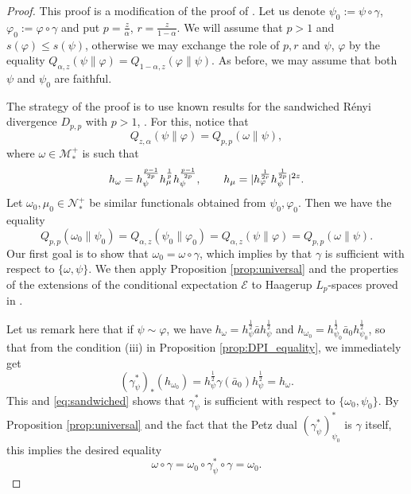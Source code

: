 \documentclass[12pt]{article}
\theoremstyle{definition}
\theoremstyle{remark}
\numberwithin{equation}{section}
\def\cE{\mathcal E}
\def\Me{\mathcal M}
\def\Ne{\mathcal N}
\def\ffi{\varphi}
\begin{document}
\begin{proof} This proof is a modification of the proof of \cite[Thm.
5.1]{jencova2021renyi}. Let us denote $\psi_0:=\psi\circ\gamma$,
$\varphi_0:=\varphi\circ\gamma$ and put $p=\frac{z}{\alpha}$, $r=\frac{z}{1-\alpha}$.  
We will assume that $p>1$ and $s(\ffi)\le s(\psi)$,
otherwise we may exchange the role of $p,r$ and $\psi$, $\ffi$ by the equality
$Q_{\alpha,z}(\psi\|\varphi)=Q_{1-\alpha,z}(\varphi\|\psi)$. As before, we may assume that
both $\psi$ and $\psi_0$ are faithful.

The strategy of the proof is to use known results for the sandwiched R\'enyi divergence
$D_{p,p}$ with $p>1$, \cite[]{jencova2018renyi}. For this, notice that
\[
Q_{z,\alpha}(\psi\|\ffi)=Q_{p,p}(\omega\|\psi),
\]
where $\omega\in \Me_*^+$ is such that
\begin{equation}\label{eq:omega}
h_\omega=h_\psi^{p-1\over 2p}h_\mu^{\frac1p}h_\psi^{p-1\over 2p},\qquad
h_{\mu}=|h_{\ffi}^{1\over 2r}h_{\psi}^{1\over 2p}|^{2z}.
\end{equation}
Let $\omega_0,\mu_0\in \Ne_*^+$ be similar functionals obtained from $\psi_0,\ffi_0$. Then
we have the equality
\begin{equation}\label{eq:sandwiched}
Q_{p,p}(\omega_0\|\psi_0)=Q_{\alpha,z}(\psi_0\|\ffi_0)=Q_{\alpha,z}(\psi\|\ffi)=Q_{p,p}(\omega\|\psi).
\end{equation}
Our first goal is to show that $\omega_0=\omega\circ\gamma$, which implies by
\cite[]{jencova2018renyi} that $\gamma$ is sufficient with respect to $\{\omega,\psi\}$. 
We then apply Proposition \ref{prop:universal} and the properties of the extensions of the
conditional expectation $\cE$ to Haagerup $L_p$-spaces proved in
\cite{junge2003noncommutative}. 


Let us remark here that if $\psi\sim \ffi$, we have
$h_\omega=h_\psi^{\frac12}\bar ah_\psi^{\frac12}$ and
$h_{\omega_0}=h_{\psi_0}^{\frac12}\bar a_0h_{\psi_0}^{\frac12}$, so that from the condition (iii) in Proposition
\ref{prop:DPI_equality}, we immediately get
\[
(\gamma^*_{\psi})_*(h_{\omega_0})=h_\psi^{\frac12}\gamma(\bar
a_0)h_\psi^{\frac12}=h_\omega.
\]
This and \eqref{eq:sandwiched} shows that $\gamma^*_\psi$ is sufficient with respect to
$\{\omega_0,\psi_0\}$. By Proposition \ref{prop:universal} and the fact that the
Petz dual  $(\gamma_\psi^*)_{\psi_0}^*$ is $\gamma$ itself, this implies the desired
equality
\[
\omega\circ\gamma= \omega_0\circ \gamma_\psi^*\circ\gamma=\omega_0.
\]






\end{proof}
\end{document}
